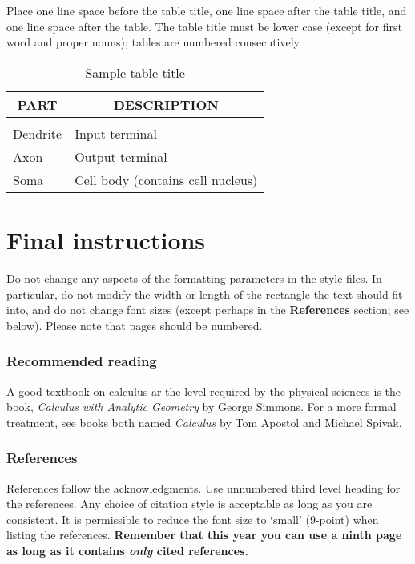 \documentclass{article} %
\theoremstyle{definition}
\begin{document}
Place one line space before the table title, one line space after the table
title, and one line space after the table. The table title must be lower case
(except for first word and proper nouns); tables are numbered consecutively.

\begin{table}[t]
\caption{Sample table title}
\label{sample-table}
\begin{center}
\begin{tabular}{ll}
\multicolumn{1}{c}{\bf PART}  &\multicolumn{1}{c}{\bf DESCRIPTION}
\\ \hline \\
Dendrite         &Input terminal \\
Axon             &Output terminal \\
Soma             &Cell body (contains cell nucleus) \\
\end{tabular}
\end{center}
\end{table}

\section{Final instructions}
Do not change any aspects of the formatting parameters in the style files.
In particular, do not modify the width or length of the rectangle the text
should fit into, and do not change font sizes (except perhaps in the
\textbf{References} section; see below). Please note that pages should be
numbered.

\subsubsection*{Recommended reading}

A good textbook on calculus ar the level required by the physical sciences
is the book, \emph{Calculus with Analytic Geometry} by George Simmons. For
a more formal treatment, see books both named \emph{Calculus} by Tom Apostol
and Michael Spivak.

\subsubsection*{References}

References follow the acknowledgments. Use unnumbered third level heading for
the references. Any choice of citation style is acceptable as long as you are
consistent. It is permissible to reduce the font size to `small' (9-point) 
when listing the references. {\bf Remember that this year you can use
a ninth page as long as it contains \emph{only} cited references.}
\end{document}
